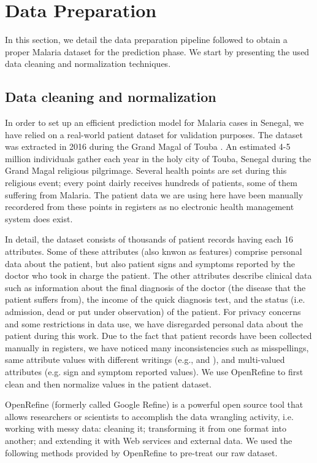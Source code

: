 \section{Data Preparation}\label{data_prep}
In this section, we detail the data preparation pipeline followed to obtain a proper Malaria dataset for the prediction phase.
We start by presenting the used data cleaning and normalization techniques.


\subsection{Data cleaning and normalization}
In order to set up an efficient prediction model for Malaria cases in Senegal, we have relied on a real-world patient dataset
for validation purposes. The dataset was extracted in 2016 during the Grand Magal of Touba \cite{So17}. 
An estimated 4-5 million individuals gather each year in the holy city of Touba, Senegal during the Grand Magal religious pilgrimage.
Several health points are set during this religious event; every point dairly receives hundreds of patients, some of them 
suffering from Malaria. The patient data we are using here have been manually recordered from these points in registers as no electronic
health management system does exist.  

In detail, the dataset consists of thousands of patient records having each 16 attributes. Some of these
attributes (also knwon as features) comprise personal data about the patient, but also patient signs and symptoms
reported by the doctor who took in charge the patient. The other attributes describe clinical data such as information about the final diagnosis
of the doctor (the disease that the patient suffers from), the income of the quick diagnosis test, and the status (i.e. admission, 
dead or put under observation) of the patient. For privacy concerns and some restrictions in data use, we have disregarded personal data about
the patient during this work. Due to the fact that patient records have been collected manually in registers, we have noticed many inconsistencies 
such as misspellings, same attribute values with different writings (e.g.,  and ),
 and multi-valued attributes (e.g. sign and symptom reported values). We use OpenRefine \cite{Ku16,openRefine} to first clean and then normalize values in the patient dataset.

OpenRefine (formerly called Google Refine) is a powerful open source tool that allows researchers or scientists to accomplish the data wrangling activity, i.e. 
working with messy data: cleaning it; transforming it from one format into another; and extending it with Web services and external data.    
We used the following methods provided by OpenRefine to pre-treat our raw dataset.

